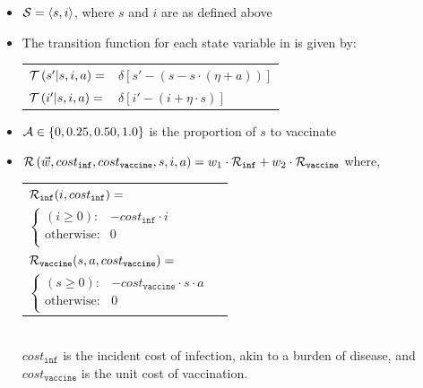 \begin{itemize}
    \item {\footnotesize $ \mathcal{S} = \left\langle s, i \right\rangle$}, where $ s $ and $ i $ are as defined above
    \item The transition function {\footnotesize \Transition} for each state variable in {\footnotesize \State} is given by:    \\
    {\footnotesize 
        \abovedisplayskip=5pt
        \belowdisplayskip=0pt
        \renewcommand{\arraystretch}{1.5}
        \begin{tabular}{ll}
            $ \mathcal{T}\left( s' | s, i, a \right) =$ & $ \delta \left[ s' - (s - s \cdot (\eta + a)) \right] $ \\
            $ \mathcal{T}\left( i' | s, i, a \right) =$ & $ \delta \left[ i' - (i + \eta \cdot s) \right] $ \\
        \end{tabular}
    }%
    \item {\footnotesize $ \mathcal{A} \in \left\lbrace 0, 0.25, 0.50, 1.0 \right\rbrace $} is the proportion of $ s $ to vaccinate 
    \item {\footnotesize $ \mathcal{R}\left(\vec{w}, cost_{\mathtt{inf}}, cost_{\mathtt{vaccine}}, s, i, a \right) = w_1 \cdot \mathcal{R}_{\mathtt{inf}} + w_2 \cdot \mathcal{R}_{\mathtt{vaccine}}$} where, \\
    {\footnotesize 
        \abovedisplayskip=10pt
        \belowdisplayskip=0pt
        \renewcommand{\arraystretch}{1.5}
        \begin{tabular}{ll}    
            $ \mathcal{R}_{\mathtt{inf}}(i, cost_{\mathtt{inf}}) = $ &  $ $ \\
            \qquad $ \begin{cases}
            (i \geq 0) : & -cost_{\mathtt{inf}} \cdot i \\
            \text{otherwise} : & 0 \\
            \end{cases} $ & $ $ \\
            $ \mathcal{R}_{\mathtt{vaccine}}(s, a, cost_{\mathtt{vaccine}}) = $ &  $ $ \\
            \qquad $ \begin{cases}
            (s \geq 0) : & -cost_{\mathtt{vaccine}} \cdot s \cdot a \\
            \text{otherwise} : & 0 \\
            \end{cases} $ & $ $ \\
        \end{tabular}
    } \\
    {\footnotesize $ cost_{\mathtt{inf}} $} is the incident cost of infection, akin to a burden of disease, and {\footnotesize $ cost_{\mathtt{vaccine}} $} is the unit cost of vaccination.
\end{itemize} 

